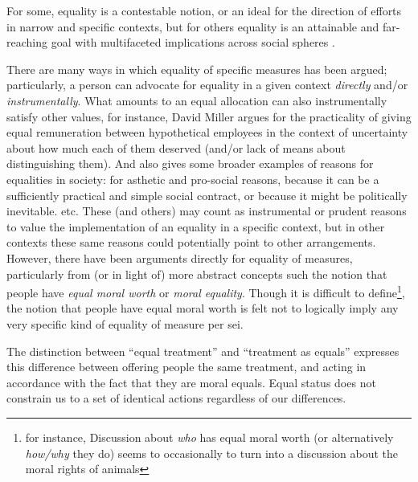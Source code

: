 For some, equality is a contestable notion, or an ideal for the direction of efforts in narrow and specific contexts, but for others equality is an attainable and far-reaching goal with multifaceted implications across social spheres \cite{walzer2008spheres,millerandwalzer,baker1992arguing}.

There are many ways in which equality of specific measures has been argued; particularly, a person can advocate for equality in a given context \textit{directly} and/or \textit{instrumentally}.
What amounts to an equal allocation can also instrumentally satisfy other values, for instance, David Miller \cite{equalityandjustice:1998} argues for the practicality of giving equal remuneration between hypothetical employees in the context of uncertainty about how much each of them deserved (and/or lack of means about distinguishing them). And also gives some broader examples of reasons for equalities in society: for asthetic and pro-social reasons, because it can be a sufficiently practical and simple social contract, or because it might be politically inevitable. etc.
These (and others) may count as instrumental or prudent reasons to value the implementation of an equality in a specific context, but in other contexts these same reasons could potentially point to other arrangements.
However, there have been arguments directly for equality of measures, particularly from (or in light of) more abstract concepts such the notion that people have \textit{equal moral worth} \cite{doallpersonshaveequalmoralworth} or \textit{moral equality}. Though it is difficult to define\footnote{for instance, Discussion about \textit{who} has equal moral worth (or alternatively \textit{how/why} they do) seems to occasionally to turn into a discussion about the moral rights of animals}, the notion that people have equal moral worth is felt not to logically imply any very specific kind of equality of measure per sei.

\begin{displayquote}
The distinction between ``equal treatment'' and ``treatment as equals'' expresses this difference between offering people the same treatment, and acting in accordance with the fact that they are moral equals. Equal status does not constrain us to a set of identical actions regardless of our differences.\cite{whatisbasicequalitynathan}
\end{displayquote}

